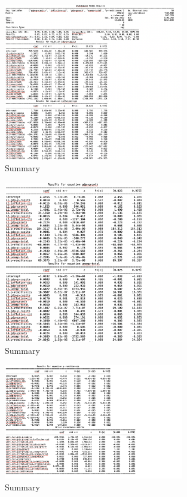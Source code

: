 \begin{figure}[H]
    \centering
    \includegraphics[width=0.7\textwidth]{Images/var1.png}
    \caption{Summary}
    \label{fig1}
\end{figure}

\begin{figure}[H]
    \centering
    \includegraphics[width=0.7\textwidth]{Images/var2.png}
    \caption{Summary}
    \label{fig1}
\end{figure}


\begin{figure}[H]
    \centering
    \includegraphics[width=0.7\textwidth]{Images/var3.png}
    \caption{Summary}
    \label{fig1}
\end{figure}

